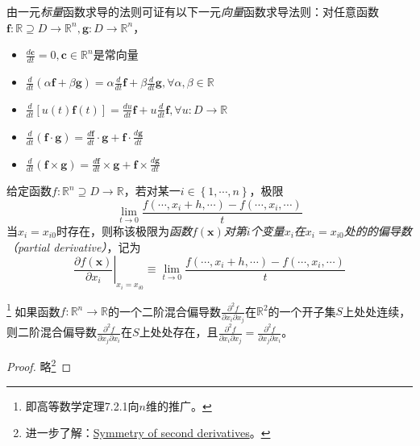 \documentclass[main.tex]{subfiles}
\begin{document}
由一元\emph{标量}函数求导的法则可证有以下一元\emph{向量}函数求导法则：对任意函数$\mathbf{f}:\mathbb{R}\supseteq D\rightarrow\mathbb{R}^n,\mathbf{g}:D\rightarrow\mathbb{R}^n$，
\begin{itemize}
    \item $\frac{d\mathbf{c}}{dt}=0,\mathbf{c}\in\mathbb{R}^n$是常向量
    \item $\frac{d}{dt}\left(\alpha\mathbf{f}+\beta\mathbf{g}\right)=\alpha\frac{d}{dt}\mathbf{f}+\beta\frac{d}{dt}\mathbf{g},\forall \alpha,\beta\in\mathbb{R}$
    \item $\frac{d}{dt}\left[u\left(t\right)\mathbf{f}\left(t\right)\right]=\frac{du}{dt}\mathbf{f}+u\frac{d}{dt}\mathbf{f},\forall u:D\rightarrow\mathbb{R}$
    \item $\frac{d}{dt}\left(\mathbf{f}\cdot\mathbf{g}\right)=\frac{d\mathbf{f}}{dt}\cdot\mathbf{g}+\mathbf{f}\cdot\frac{d\mathbf{g}}{dt}$
    \item $\frac{d}{dt}\left(\mathbf{f}\times\mathbf{g}\right)=\frac{d\mathbf{f}}{dt}\times\mathbf{g}+\mathbf{f}\times\frac{d\mathbf{g}}{dt}$
\end{itemize}

\begin{definition}[多元标量值函数的偏导数]\label{def:II.4.10}
    给定函数$f:\mathbb{R}^n\supseteq D\rightarrow\mathbb{R}$，若对某一$i\in\left\{1,\cdots,n\right\}$，极限
    \[
        \lim_{t\to0}\frac{f\left(\cdots,x_{i}+h,\cdots\right)-f\left(\cdots,x_{i},\cdots\right)}{t}
    \]
    当$x_i=x_{i0}$时存在，则称该极限为\emph{函数$f\left(\mathbf{x}\right)$对第$i$个变量$x_i$在$x_i=x_{i0}$处的的偏导数（partial derivative）}，记为
    \[\left.\frac{\partial f\left(\mathbf{x}\right)}{\partial x_i}\right|_{x_i=x_{i0}}\equiv\lim_{t\to0}\frac{f\left(\cdots,x_{i}+h,\cdots\right)-f\left(\cdots,x_i,\cdots\right)}{t}
    \]
\end{definition}

\begin{theorem}\label{thm:II.4.6}\footnote{即高等数学\cite[p.~16]{华工高数2009下}定理7.2.1向$n$维的推广。}
    如果函数$f:\mathbb{R}^n\rightarrow\mathbb{R}$的一个二阶混合偏导数$\frac{\partial^2f}{\partial x_i\partial x_j}$在$\mathbb{R}^2$的一个开子集$S$上处处连续，则二阶混合偏导数$\frac{\partial^2f}{\partial x_j\partial x_i}$在$S$上处处存在，且$\frac{\partial^2f}{\partial x_i\partial x_j}=\frac{\partial^2f}{\partial x_j\partial x_i}$。
\end{theorem}
\begin{proof}
    略\footnote{进一步了解：\href{https://en.wikipedia.org/wiki/Symmetry_of_second_derivatives}{Symmetry of second derivatives}。}
\end{proof}
\end{document}

